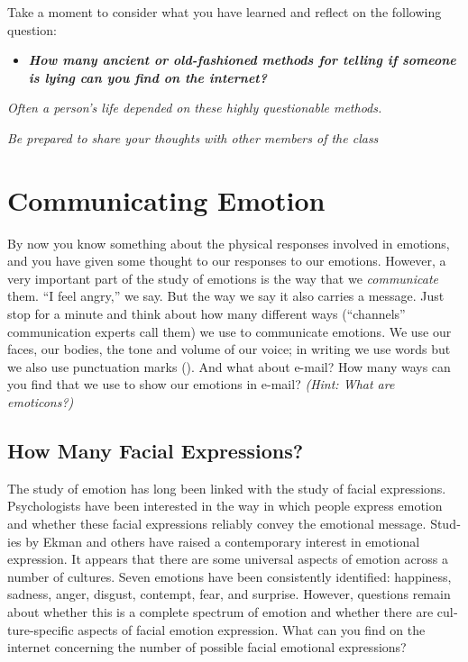 \documentclass[
]{book}
\providecommand{\tightlist}{%
  \setlength{\itemsep}{0pt}\setlength{\parskip}{0pt}}
\begin{document}
\begin{reflect}
Take a moment to consider what you have learned and reflect on the following question:

\begin{itemize}
\tightlist
\item
  \textbf{\emph{How many ancient or old-fashioned methods for telling if someone is lying can you find on the internet?}}
\end{itemize}

\emph{Often a person's life depended on these highly questionable methods.}

\emph{Be prepared to share your thoughts with other members of the class}
\end{reflect}

\hypertarget{communicating-emotion}{%
\section{Communicating Emotion}\label{communicating-emotion}}

By now you know something about the physical responses involved in emotions, and you have given some thought to our responses to our emotions. However, a very important part of the study of emotions is the way that we \emph{communicate} them. ``I feel angry,'' we say. But the way we say it also carries a message. Just stop for a minute and think about how many different ways (``channels'' communication experts call them) we use to communicate emotions. We use our faces, our bodies, the tone and volume of our voice; in writing we use words but we also use punctuation marks (). And what about e-mail? How many ways can you find that we use to show our emotions in e-mail? \emph{(Hint: What are emoticons?)}

\hypertarget{how-many-facial-expressions}{%
\subsection*{How Many Facial Expressions?}\label{how-many-facial-expressions}}

The study of emotion has long been linked with the study of facial expressions. Psychologists have been interested in the way in which people express emotion and whether these facial expressions reliably convey the emotional message. Stud­ies by Ekman and others have raised a contemporary interest in emotional expression. It appears that there are some universal aspects of emotion across a number of cul­tures. Seven emotions have been consistently identified: happi­ness, sadness, anger, disgust, contempt, fear, and surprise. However, questions remain about whether this is a complete spectrum of emotion and whether there are cul­ture-specific aspects of facial emotion expression. What can you find on the internet concerning the number of possible facial emotional expressions?
\end{document}
